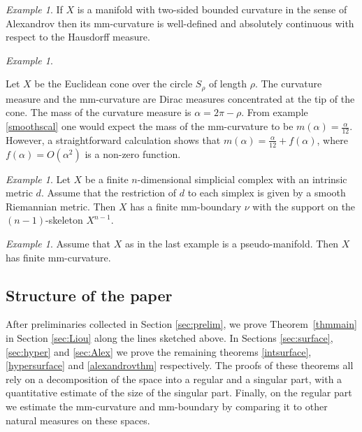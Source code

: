\documentclass[12pt,leqno,intlimits]{amsart}
\numberwithin{equation}{section}
\theoremstyle{definition}
\theoremstyle{remark}
\newtheorem{ex}[thm]{Example}
\newcommand{\tref}[1]{Theorem~\ref{#1}}
\begin{document}
\begin{ex}
If $X$ is a manifold with two-sided bounded curvature in the sense of Alexandrov then its mm-curvature is well-defined and absolutely continuous with respect to the Hausdorff measure.
\end{ex}

\begin{ex} \label{ex:cone}

Let $X$ be the Euclidean  cone over the circle $S_{\rho}$ of length $\rho$.
The curvature measure and the mm-curvature are Dirac measures 
concentrated   at the tip of the cone.  The mass of the curvature measure is $\alpha =2\pi-\rho$.
From example \ref{smoothscal} one would expect the mass of the mm-curvature to be $m(\alpha) = \frac {\alpha} {12}$.
However, a straightforward calculation shows that $m(\alpha)=\frac \alpha {12}+ f(\alpha)$, where $f(\alpha)= O(\alpha^2)$ is a non-zero function.

\end{ex}

\begin{ex} \label{ex:secondlast}
Let $X$ be a finite $n$-dimensional simplicial complex with an intrinsic metric $d$.
Assume that the restriction of $d$ to each simplex is given by a smooth Riemannian metric.
Then $X$ has a finite mm-boundary $\nu$ with the support on the $(n-1)$-skeleton $X^{n-1}$.
\end{ex}

\begin{ex} \label{ex:last}
Assume that $X$ as in the last example is a pseudo-manifold.
Then $X$ has finite mm-curvature.
\end{ex}

\subsection{Structure of the paper}
After preliminaries collected in Section \ref{sec:prelim}, we prove \tref{thmmain} in Section \ref{sec:Liou} along the lines sketched above.
In Sections \ref{sec:surface}, \ref{sec:hyper} and \ref{sec:Alex} we prove the remaining theorems \ref{intsurface}, \ref{hypersurface} and \ref{alexandrovthm} respectively.
The proofs of these theorems all rely on a decomposition of the space into a regular and a singular part, with a quantitative estimate of the size of the singular part.
Finally, on the regular part we estimate the mm-curvature and mm-boundary  by comparing it to other natural measures on these spaces.
\end{document}
